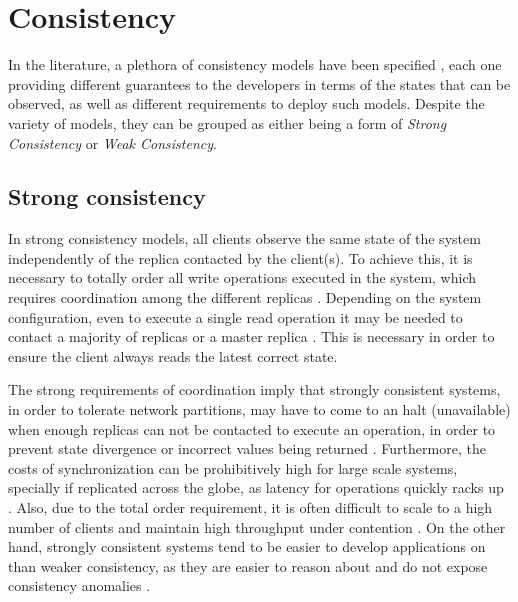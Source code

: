 \section{Consistency}
\label{sec:consistency}

In the literature, a plethora of consistency models have been specified \cite{linearizability, si, spanner, understandingEC, cops, dynamo, cassandra}, each one providing different guarantees to the developers in terms of the states that can be observed, as well as different requirements to deploy such models.
Despite the variety of models, they can be grouped as either being a form of \emph{Strong Consistency} or \emph{Weak Consistency}.

\subsection{Strong consistency}
\label{subsec:strong}

In strong consistency models, all clients observe the same state of the system independently of the replica contacted by the client(s).
To achieve this, it is necessary to totally order all write operations executed in the system, which requires coordination among the different replicas \cite{linearizability,spanner,caerus,mdcc,detock,chainreaction}.
Depending on the system configuration, even to execute a single read operation it may be needed to contact a majority of replicas or a master replica \cite{spanner,slog}.
This is necessary in order to ensure the client always reads the latest correct state.

The strong requirements of coordination imply that strongly consistent systems, in order to tolerate network partitions, may have to come to an halt (unavailable) when enough replicas can not be contacted to execute an operation, in order to prevent state divergence or incorrect values being returned \cite{sconekv,cure,chainreaction,dynamo}.
Furthermore, the costs of synchronization can be prohibitively high for large scale systems, specially if replicated across the globe, as latency for operations quickly racks up \cite{caerus,mdcc,detock}.
Also, due to the total order requirement, it is often difficult to scale to a high number of clients and maintain high throughput under contention \cite{krikellas2010strongly,dynamo}.
On the other hand, strongly consistent systems tend to be easier to develop applications on than weaker consistency, as they are easier to reason about and do not expose consistency anomalies \cite{spanner,sconekv,slog,chainreaction,dynamo}.

